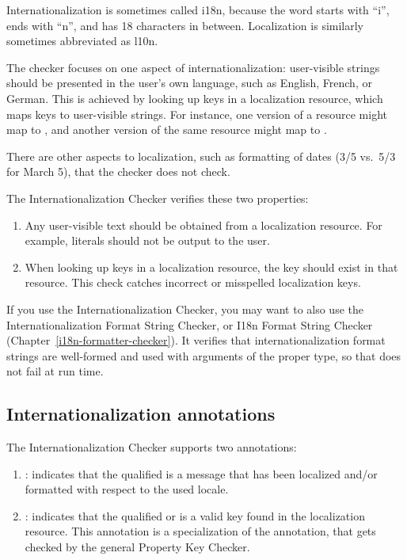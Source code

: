 Internationalization is sometimes called i18n, because the word starts with ``i'',
ends with ``n'', and has 18 characters in between.  Localization is similarly
sometimes abbreviated as l10n.

The checker focuses on one aspect of internationalization:  user-visible strings
should be presented in the user's own language, such as English, French, or
German.  This is achieved by looking up keys in a localization resource,
which maps keys to user-visible strings.  For instance, one version of a
resource might map  to
, and another version of the same resource might map
 to .

There are other aspects to localization, such as formatting of dates (3/5
vs.~5/3 for March 5), that the checker does not check.

The Internationalization Checker verifies these two properties:

\begin{enumerate}

\item
  Any user-visible text should be obtained from a localization resource.
  For example,  literals should not be output to the user.

\item
  When looking up keys in a localization resource, the key should exist in
  that resource.  This check catches incorrect or misspelled localization
  keys.

\end{enumerate}

If you use the Internationalization Checker, you may want to also use the
Internationalization Format String Checker, or I18n Format String Checker
(Chapter~\ref{i18n-formatter-checker}).
It verifies that internationalization format strings are well-formed and
used with arguments of the proper type, so that
does not fail at run time.

\subsection{Internationalization annotations\label{i18n-annotations}}

The Internationalization Checker supports two annotations:

\begin{enumerate}
\item {}: indicates that the qualified
 is a message that has been localized and/or formatted with
respect to the used locale.

\item {}: indicates that the
qualified  or  is a valid key found in the
localization resource.
This annotation is a specialization of the  annotation, that
gets checked by the general Property Key Checker.
\end{enumerate}

